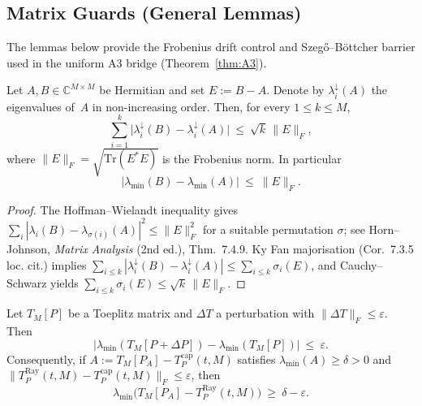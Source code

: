 \subsection{Matrix Guards (General Lemmas)}\label{subsec:a3-matrix-guard}


The lemmas below provide the Frobenius drift control and Szeg\H{o}--B\"ottcher barrier
used in the uniform A3 bridge (Theorem~\ref{thm:A3}).

\begin{lemma}\label{lem:hw-kf}
Let $A,B\in\mathbb{C}^{M\times M}$ be Hermitian and set $E:=B-A$. Denote by $\lambda_i^{\downarrow}(A)$ the eigenvalues of~$A$ in non-increasing order. Then, for every $1\le k\le M$,
\[
  \sum_{i=1}^k \bigl|\lambda_i^{\downarrow}(B)-\lambda_i^{\downarrow}(A)\bigr|\ \le\ \sqrt{k}\,\|E\|_F,
\]
where $\|E\|_F=\sqrt{\mathrm{Tr}(E^*E)}$ is the Frobenius norm.
In particular
\[
  \bigl|\lambda_{\min}(B)-\lambda_{\min}(A)\bigr|\ \le\ \|E\|_F.
\]
\end{lemma}

\begin{proof}
The Hoffman--Wielandt inequality gives
\(\sum_i |\lambda_i(B)-\lambda_{\sigma(i)}(A)|^2\le \|E\|_F^2\) for a suitable permutation $\sigma$; see Horn--Johnson, \emph{Matrix Analysis} (2nd ed.), Thm.~7.4.9. Ky Fan majorisation (Cor.~7.3.5 loc.
cit.) implies
\(\sum_{i\le k} |\lambda_i^{\downarrow}(B)-\lambda_i^{\downarrow}(A)| \le \sum_{i\le k} \sigma_i(E)\), and Cauchy--Schwarz yields
\(\sum_{i\le k} \sigma_i(E) \le \sqrt{k}\,\|E\|_F\).
\end{proof}

\begin{corollary}\label{cor:toeplitz-frob}
Let $T_M[P]$ be a Toeplitz matrix and $\Delta T$ a perturbation with $\|\Delta T\|_F\le \varepsilon$. Then
\[
  \bigl|\lambda_{\min}(T_M[P+\Delta P]) - \lambda_{\min}(T_M[P])\bigr|\ \le\ \varepsilon.
\]
Consequently, if $A:=T_M[P_A]-T_P^{\mathrm{cap}}(t,M)$ satisfies $\lambda_{\min}(A)\ge \delta>0$ and $\|T_P^{\mathrm{Ray}}(t,M)-T_P^{\mathrm{cap}}(t,M)\|_F\le \varepsilon$, then
\[
  \lambda_{\min}\bigl(T_M[P_A]-T_P^{\mathrm{Ray}}(t,M)\bigr)\ \ge\ \delta-\varepsilon.
\]
\end{corollary}

